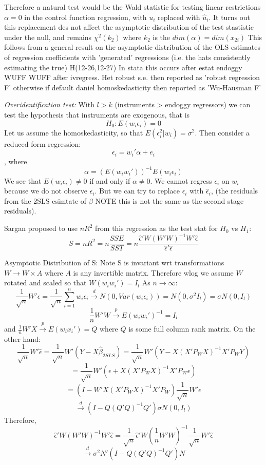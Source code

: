 \documentclass[DIV=14,titlepage=false]{scrreprt}
\begin{document}
Therefore a natural test would be the Wald statistic for testing linear restrictions \(\alpha=0\) in the control function regression, with \(u_i\) replaced with \(\hat u_i\).
It turns out this replacement des not affect the asymptotic distribution of the test stastistic under the null, and remains \(\chi^2(k_2)\) where \(k_2\) is the \(dim(\alpha)=dim(x_{2i})\) 
This follows from a general result on the asymptotic distribution of the OLS estimates of regression coefficients with 'generated' regressions (i.e. the hats consistently estimating the true) H(12-26,12-27)
In stata this occurs after estat endoggy WUFF WUFF after ivregress. Het robust s.e. then reported as 'robust regression F' otherwise if default daniel homoskedasticity then reported as 'Wu-Hausman F'

\textit{Overidentification test:}
With \(l>k\) (instruments > endoggy regressors) we can test the hypothesis that instruments are exogenous, that is
\[H_0: E(w_i\epsilon_i)=0\]
Let us assume the homoskedasticity, so that \(E(\epsilon_i^2|w_i)=\sigma^2\). Then consider a reduced form regression:
\[\epsilon_i=w_i'\alpha+e_i\],
where
\[\alpha=(E(w_iw_i'))^{-1}E(w_i\epsilon_i)\]
We see that \(E(w_i\epsilon_i)\neq0\) if and only if \(\alpha\neq0\).
We cannot regress \(\epsilon_i\) on \(w_i\) because we do not observe \(\epsilon_i\). But we can try to replace \(\epsilon_i\) with \(\hat \epsilon_i\),
(the residuals from the 2SLS esimtate of \(\beta\) NOTE this is not the same as the second stage residuals).

Sargan proposed to use \(nR^2\) from this regression as the test stat for \(H_0\) vs \(H_1\):
\[S=nR^2=n\frac{SSE}{SST}=n\frac{\hat\epsilon'W(W'W)^{-1}W'\hat\epsilon}{\hat\epsilon'\hat\epsilon}\]

Asymptotic Distribution of S:
Note S is invariant wrt transformations \(W \rightarrow W\times A\) where \(A\) is any invertible matrix. Therefore wlog we assume \(W\) rotated and scaled so that \(W(w_iw_i')=I_l\) As \(n\rightarrow\infty\):
\[\frac{1}{\sqrt{n}}W'\epsilon=\frac{1}{\sqrt{n}}\sum_{i=1}^n w_i\epsilon_i\xrightarrow{d}N(0,Var(w_i\epsilon_i))=N(0,\sigma^2I_l)=\sigma N(0,I_l)\]
\[\frac{1}{n}W'W\xrightarrow{p}E(w_iw_i')^{-1}=I_l\]
and \(\frac{1}{n}W'X\xrightarrow{p}E(w_ix_i')=Q\) where \(Q\) is some full column rank matrix. On the other hand:
\[\frac{1}{\sqrt{n}}W'\hat\epsilon=\frac{1}{\sqrt{n}}W'(Y-X\hat\beta_{2SLS})=\frac{1}{\sqrt{n}}W'(Y-X(X'P_WX)^{-1}X'P_WY)\]
\[=\frac{1}{\sqrt{n}}W'(\epsilon + X(X'P_WX)^{-1}X'P_W\epsilon)\]
\[=(I-W'X(X'P_WX)^{-1}X'P_W)\frac{1}{\sqrt{n}}W'\epsilon\]
\[\xrightarrow{d} (I-Q(Q'Q)^{-1}Q')\sigma N(0,I_l)\]
Therefore,
\[\hat\epsilon'W(W'W)^{-1}W'\hat\epsilon=\frac{1}{\sqrt{n}}\hat\epsilon'W(\frac{1}{n}W'W)^{-1}\frac{1}{\sqrt{n}}W'\hat\epsilon\]
\[\xrightarrow{d} \sigma^2N'(I-Q(Q'Q)^{-1}Q') N\]
\end{document}
